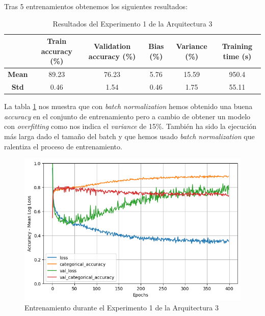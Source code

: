 \documentclass{article}
\begin{document}
			Tras 5 entrenamientos obtenemos los siguientes resultados:
			
			\begin{table}[!h]
				\begin{center}
					\begin{tabular}{ c | c | c | c | c | c |}
						\ & \textbf{Train accuracy (\%)} & \textbf{Validation accuracy (\%)} & \textbf{Bias (\%)} & \textbf{Variance (\%)} & \textbf{Training time (s)} \\ \hline
						\textbf{Mean} & 89.23 & 76.23 & 5.76 & 15.59 & 950.4 \\ \hline
						\textbf{Std} & 0.46 & 1.54 & 0.46 & 1.75 & 55.11 \\ \hline
					\end{tabular}
					\caption{Resultados del Experimento 1 de la Arquitectura 3}
					\label{tab:res-a3-e1}
				\end{center}
			\end{table}
			La tabla \ref{tab:res-a3-e1} nos muestra que con \textit{batch normalization} hemos obtenido una buena \textit{accuracy} en el conjunto de entrenamiento pero a cambio de obtener un modelo con \textit{overfitting} como nos indica el \textit{variance} de 15\%. Tambi\'en ha sido la ejecuci\'on m\'as larga dado el tama\~no del batch y que hemos usado \textit{batch normalization} que ralentiza el proceso de entrenamiento.
			\newpage
			 
			\begin{figure}[!h]
				\begin{center}
					\includegraphics[scale=0.5]{tr-a3-e1.png}		
					\caption{Entrenamiento durante el Experimento 1 de la Arquitectura 3}	
					\label{tr-a3-e1}
				\end{center}
			\end{figure}
			
\end{document}
